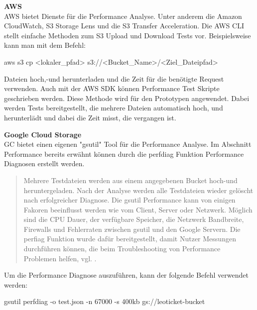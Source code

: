 \textbf{AWS}\\

AWS bietet Dienste für die Performance Analyse. Unter anderem die Amazon CloudWatch, S3 Storage Lens und die S3 Transfer Acceleration. Die AWS CLI stellt einfache Methoden zum S3 Upload und Download Tests vor. Beispielsweise kann man mit dem Befehl:


\begin{code} aws s3 cp <lokaler_pfad> s3://<Bucket_Name>/<Ziel_Dateipfad>\end{code}

Dateien hoch,-und herunterladen und die Zeit für die benötigte Request verwenden. Auch mit der AWS SDK können Performance Test Skripte geschrieben werden. Diese Methode wird für den Prototypen angewendet. Dabei werden Tests bereitgestellt, die mehrere Dateien automatisch hoch, und herunterlädt und dabei die Zeit misst, die vergangen ist. 

\newpage

\textbf{Google Cloud Storage}\\

GC bietet einen eigenen "gsutil" Tool für die Performance Analyse. Im Abschnitt Performance bereits erwähnt können durch die perfdiag Funktion Performance Diagnosen erstellt werden. 

\begin{quote}
	Mehrere Testdateien werden aus einem angegebenen Bucket hoch-und heruntergeladen. Nach der Analyse werden alle Testdateien wieder gelöscht nach erfolgreicher Diagnose. Die gsutil Performance kann von einigen Fakoren beeinflusst werden wie vom Client, Server oder Netzwerk. Möglich sind die CPU Dauer, der verfügbare Speicher, die Netzwerk Bandbreite, Firewalls und Fehlerraten zwischen gsutil und den Google Servern. Die perfiag Funktion wurde dafür bereitgestellt, damit Nutzer Messungen durchführen können, die beim Troubleshooting von Performance Problemen helfen, vgl. \cite{gc-perfdiag}.
\end{quote}

Um die Performance Diagnose auszuführen, kann der folgende Befehl verwendet werden:

\begin{code} gsutil perfdiag -o test.json -n 67000 -s 400kb gs://leoticket-bucket \end{code}

